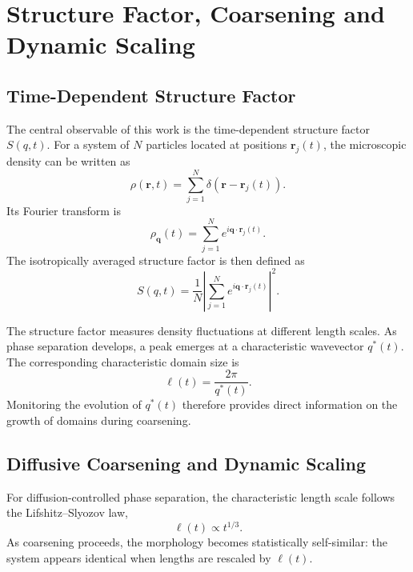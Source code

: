 \documentclass[11pt,a4paper]{article}
\begin{document}
\section{Structure Factor, Coarsening and Dynamic Scaling}

\subsection{Time-Dependent Structure Factor}

The central observable of this work is the time-dependent structure factor $S(q,t)$. For a system of $N$ particles located at positions $\mathbf r_j(t)$, the microscopic density can be written as
\begin{equation}
    \rho(\mathbf r,t)
    =
    \sum_{j=1}^{N}\delta(\mathbf r-\mathbf r_j(t)).
\end{equation}
Its Fourier transform is
\begin{equation}
    \rho_{\mathbf q}(t)
    =
    \sum_{j=1}^{N} e^{i\mathbf q\cdot\mathbf r_j(t)}.
\end{equation}
The isotropically averaged structure factor is then defined as
\begin{equation}
    S(q,t)
    =
    \frac{1}{N}
    \left|
    \sum_{j=1}^{N}e^{i\mathbf q\cdot\mathbf r_j(t)}
    \right|^2.
    \label{eq:structure_factor}
\end{equation}

The structure factor measures density fluctuations at different length scales. As phase separation develops, a peak emerges at a characteristic wavevector $q^*(t)$. The corresponding characteristic domain size is
\begin{equation}
    \ell(t) = \frac{2\pi}{q^*(t)}.
    \label{eq:domain_length}
\end{equation}
Monitoring the evolution of $q^*(t)$ therefore provides direct information on the growth of domains during coarsening.

\subsection{Diffusive Coarsening and Dynamic Scaling}

For diffusion-controlled phase separation, the characteristic length scale follows the Lifshitz--Slyozov law,
\begin{equation}
    \ell(t) \propto t^{1/3}.
\end{equation}
As coarsening proceeds, the morphology becomes statistically self-similar: the system appears identical when lengths are rescaled by $\ell(t)$.
\end{document}
